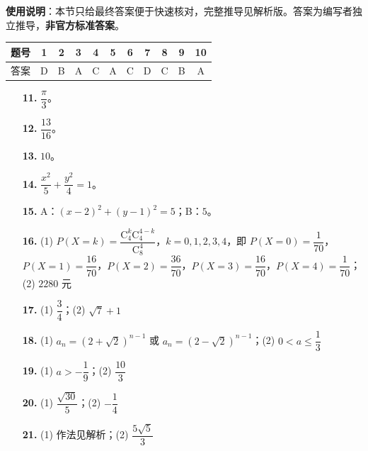 
\begin{gknotice}
\textbf{使用说明}：本节只给最终答案便于快速核对，完整推导见解析版。答案为编写者独立推导，\textbf{非官方标准答案}。
\end{gknotice}

\begin{center}\begin{tabular}{ccccccccccc}
\toprule
题号 & 1 & 2 & 3 & 4 & 5 & 6 & 7 & 8 & 9 & 10 \\
\midrule
答案 & D & B & A & C & A & C & D & C & B & A \\
\bottomrule
\end{tabular}\end{center}

\begin{itemize}[leftmargin=2.6em]
  \item[\textbf{11.}] $\dfrac\pi3$。
  \item[\textbf{12.}] $\dfrac{13}{16}$。
  \item[\textbf{13.}] $10$。
  \item[\textbf{14.}] $\dfrac{x^2}5+\dfrac{y^2}4=1$。
  \item[\textbf{15.}] A：$(x-2)^2+(y-1)^2=5$；B：$5$。
\end{itemize}

\begin{itemize}[leftmargin=2.6em]
  \item[\textbf{16.}] (1) $P(X=k)=\dfrac{\mathrm C_4^k\mathrm C_4^{4-k}}{\mathrm C_8^4}$，$k=0,1,2,3,4$，即 $P(X=0)=\dfrac1{70}$，$P(X=1)=\dfrac{16}{70}$，$P(X=2)=\dfrac{36}{70}$，$P(X=3)=\dfrac{16}{70}$，$P(X=4)=\dfrac1{70}$；(2) $2280$ 元
  \item[\textbf{17.}] (1) $\dfrac34$；(2) $\sqrt7+1$
  \item[\textbf{18.}] (1) $a_n=(2+\sqrt2)^{n-1}$ 或 $a_n=(2-\sqrt2)^{n-1}$；(2) $0<a\leqslant\dfrac13$
  \item[\textbf{19.}] (1) $a>-\dfrac19$；(2) $\dfrac{10}3$
  \item[\textbf{20.}] (1) $\dfrac{\sqrt{30}}5$；(2) $-\dfrac14$
  \item[\textbf{21.}] (1) 作法见解析；(2) $\dfrac{5\sqrt5}3$
\end{itemize}
